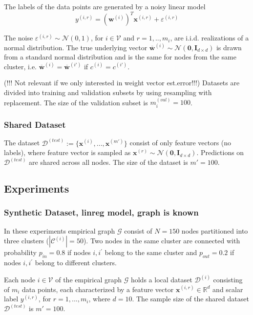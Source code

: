 \documentclass{article}
\begin{document}
The labels of the data points are generated by a noisy linear model
\begin{equation}
{y}^{(i,r)} = (\mathbf{w}^{(i)})^T\mathbf{x}^{(i,r)} + {\varepsilon}^{(i,r)}
\end{equation}

The noise ${\varepsilon}^{(i,r)} \sim \mathcal{N}(0, 1)$, for $i \in \mathcal{V}$ and $r=1,..,{m}_{i}$, are i.i.d. realizations of a normal distribution. The true underlying vector $\mathbf{\overline{w}}^{(i)} \sim \mathcal{N}(\mathbf{0},\mathbf{I}_{d \times d})$ is drawn from a standard normal distribution and is the same for nodes from the same cluster, i.e. $\mathbf{\overline{w}}^{(i)}=\mathbf{\overline{w}}^{({i'})}$ if ${c}^{(i)}={c}^{({i'})}$.

(!!! Not relevant if we only interested in weight vector est.error!!!) Datasets are divided into training and validation subsets by using resampling with replacement. The size of the validation subset is ${m}^{(val)}_{i}=100$. 

\subsubsection{Shared Dataset}

The dataset $\mathcal{D}^{(test)} := \{\mathbf{x}^{(i)}, ..., \mathbf{x}^{(m')} \}$ consist of only feature vectors (no labels), where feature vector is sampled as $\mathbf{x}^{(r)} \sim \mathcal{N}(\mathbf{0},\mathbf{I}_{d \times d})$.
Predictions on $\mathcal{D}^{(test)}$ are shared across all nodes. The size of the dataset is $m'=100$. 

\subsection{Experiments}

\subsubsection{Synthetic Dataset, linreg model, graph is known}

In these experiments empirical graph $\mathcal{G}$ consist of $N=150$ nodes partitioned into three clusters ($|\mathcal{C}^{(i)}|=50$). Two nodes in the same cluster are connected with probability ${p}_{in}=0.8$ if nodes $i,{i}^{'}$ belong to the same cluster and ${p}_{out}=0.2$ if nodes $i,{i}^{'}$ belong to different clusters. 

Each node $i \in \mathcal {V}$ of the empirical graph $\mathcal {G}$ holds a local dataset $\mathcal{D}^{(i)}$ consisting of ${m}_{i}$ data points, each characterized by a feature vector $\mathbf{x}^{(i,r)} \in \mathbb{R}^{d}$ and scalar label ${y}^{(i,r)}$, for $r=1,...,{m}_{i}$, where $d=10$.
The sample size of the shared dataset $\mathcal{D}^{(test)}$ is $m'=100$.
\end{document}
